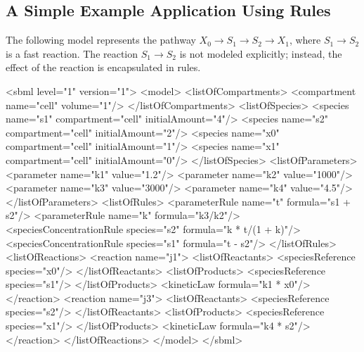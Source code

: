 \documentclass[10pt]{cekarticle}
\newcommand{\changed}[1]{\textcolor{BrickRed}{#1}}
\begin{document}
\subsection{A Simple Example Application Using Rules}
\label{subsection:ruleseg}

The following model represents the pathway $X_0 \to S_1 \to
S_2 \to X_1$, where $S_1 \to S_2$ is a fast reaction.  The
reaction $S_1 \to S_2$ is not modeled explicitly; instead, the
effect of the reaction is encapsulated in rules.


\begin{example}
<sbml level="1" version="1">
    <model>
        <listOfCompartments>
            <compartment name="cell" volume="1"/>
        </listOfCompartments>
        <listOfSpecies>
            <\changed{species} name="s1" compartment="cell" initialAmount="4"/>
            <\changed{species} name="s2" compartment="cell" initialAmount="2"/>
            <\changed{species} name="x0" compartment="cell" initialAmount="1"/>
            <\changed{species} name="x1" compartment="cell" initialAmount="0"/>
        </listOfSpecies>
        <listOfParameters>
            <parameter name="k1" value="1.2"/>
            <parameter name="k2" value="1000"/>
            <parameter name="k3" value="3000"/>
            <parameter name="k4" value="4.5"/>
        </listOfParameters>
        <listOfRules>
            <parameterRule name="t" formula="s1 + s2"/>
            <parameterRule name="k" formula="k3/k2"/>
            <\changed{speciesConcentrationRule} \changed{species=}"s2" formula="k * t/(1 + k)"/>
            <\changed{speciesConcentrationRule} \changed{species=}"s1" formula="t - s2"/>
        </listOfRules>
        <listOfReactions>
            <reaction name="j1">
                <listOfReactants>
                    <\changed{speciesReference} \changed{species=}"x0"/>
                </listOfReactants>
                <listOfProducts>
                    <\changed{speciesReference} \changed{species=}"s1"/>
                </listOfProducts>
                <kineticLaw formula="k1 * x0"/>
            </reaction>
            <reaction name="j3">
                <listOfReactants>
                    <\changed{speciesReference} \changed{species=}"s2"/>
                </listOfReactants>
                <listOfProducts>
                    <\changed{speciesReference} \changed{species=}"x1"/>
                </listOfProducts>
                <kineticLaw formula="k4 * s2"/>
            </reaction>
        </listOfReactions>
    </model>
</sbml>
\end{example}
\end{document}
